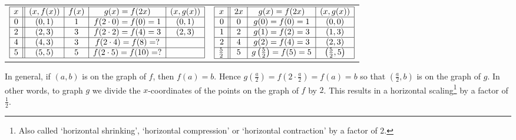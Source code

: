 \smallskip

\begin{tabular}{cc}

$ \begin{array}{|c||c|c|c|c|}  

\hline

x & (x,f(x)) & f(x)& g(x)=f(2x) & (x, g(x)) \\ \hline
0  & (0,1)& 1 & f(2 \cdot 0) = f(0) = 1   &(0, 1) \\  \hline
2 & (2,3) & 3 & f(2\cdot2) = f(4) = 3  &(2,3) \\  \hline
4 & (4,3) & 3 &  f(2 \cdot 4) = f(8) = ? &  \\  \hline
5 & (5,5) & 5 & f(2 \cdot 5) = f(10) = ?  &  \\  \hline

\end{array} $ 

&

$ \begin{array}{|r||c|c|c|}  

\hline

x & 2x & g(x)=f(2x) & (x, g(x)) \\ \hline
0 & 0 & g(0)=f(0) = 1   &(0, 0) \\  \hline
1 &  2 &  g(1)=f(2) = 3  &(1,3) \\  \hline
2 & 4  & g(2)=f(4) = 3 &  (2,3)\\  \hline
\frac{5}{2}  & 5 & g\left(\frac{5}{2}\right)=f(5) = 5  & \left(\frac{5}{2},5\right) \\ [1pt] \hline

\end{array} $

\end{tabular} 

\smallskip

In general, if $(a,b)$ is on the graph of $f$, then $f(a) = b$.  Hence $g\left(\frac{a}{2}\right) = f\left(2 \cdot \frac{a}{2}\right) = f(a) = b$ so that $\left(\frac{a}{2}, b\right)$ is on the graph of $g$.  In other words, to graph $g$ we divide the $x$-coordinates of the points on the graph of $f$ by $2$.  This results in a horizontal scaling\footnote{Also called `horizontal shrinking', `horizontal compression' or `horizontal contraction' by a factor of $2$.} by a factor of $\frac{1}{2}$.

